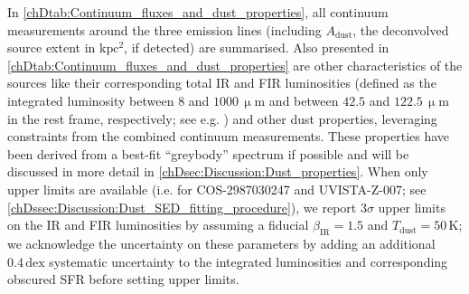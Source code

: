In \cref{chDtab:Continuum_fluxes_and_dust_properties}, all continuum measurements around the three emission lines (including $A_\text{dust}$, the deconvolved source extent in $\mathrm{kpc^2}$, if detected) are summarised. Also presented in \cref{chDtab:Continuum_fluxes_and_dust_properties} are other characteristics of the sources like their corresponding total IR and FIR luminosities (defined as the integrated luminosity between $8$ and $\num{1000} \, \mathrm{\upmu m}$ and between $42.5$ and $122.5 \, \mathrm{\upmu m}$ in the rest frame, respectively; see e.g. \citealt{2020ApJ...902...78R}) and other dust properties, leveraging constraints from the combined continuum measurements. These properties have been derived from a best-fit ``greybody'' spectrum \citep[e.g.][]{2014PhR...541...45C} if possible and will be discussed in more detail in \cref{chDsec:Discussion:Dust_properties}. When only upper limits are available (i.e. for COS-2987030247 and UVISTA-Z-007; see \cref{chDssec:Discussion:Dust_SED_fitting_procedure}), we report $3 \sigma$ upper limits on the IR and FIR luminosities by assuming a fiducial $\beta_\text{IR} = 1.5$ and $T_\text{dust} = 50 \, \mathrm{K}$; we acknowledge the uncertainty on these parameters by adding an additional $0.4 \, \mathrm{dex}$ systematic uncertainty to the integrated luminosities and corresponding obscured SFR \citep[cf.][]{2020MNRAS.499.5136C} before setting upper limits.

\subsection{\texorpdfstring{\NIILam}{[N II] 205 μm}}
\label{chDssec:Results:NII}

